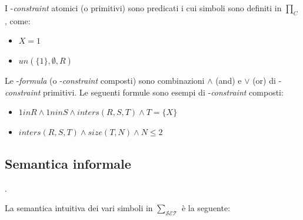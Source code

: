 \documentclass[12pt,a4paper,openright]{book} %
\begin{document}
I \calset{}-\textit{constraint} atomici (o primitivi) sono predicati i cui simboli sono definiti in $\prod_C$, come:
\begin{itemize}
\item $X = 1$
\item $un(\{1\}, \emptyset, R)$
\end{itemize}
    
Le \calset{}-\textit{formula} (o \calset{}-\textit{constraint} composti) sono combinazioni $\wedge$ (and) e $\vee$ (or) di \calset{}-\textit{constraint} primitivi. Le seguenti formule sono esempi di \calset{}-\textit{constraint} composti:
\begin{itemize}
\item $1 in R \land 1 nin S \land inters(R,S,T) \land T = \{X\}$
\item $inters(R, S, T) \land size(T, N) \land N \leq 2$
\end{itemize}

\subsection{Semantica informale}.
\label{subsec:lang_lset_semantics}

La semantica intuitiva dei vari simboli in $\sum_{\mathcal{SET}}$ è la seguente:
\end{document}
